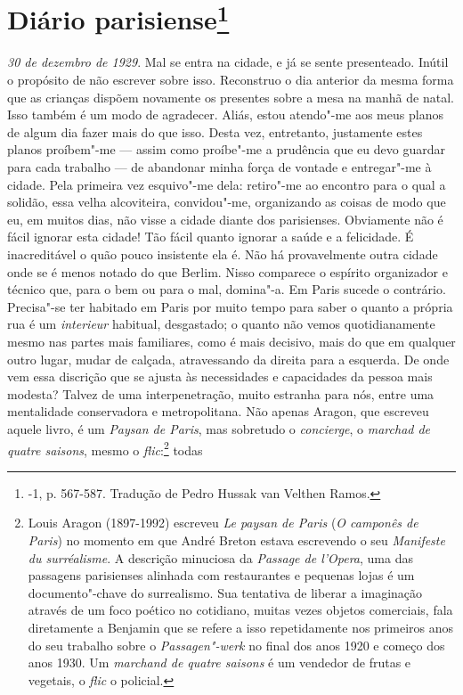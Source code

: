 \chapter{Diário parisiense\footnote[*]{-1, p.
  567-587. Tradução de Pedro Hussak van Velthen Ramos.}}

\emph{30 de dezembro de 1929}. Mal se entra na cidade, e já se sente
presenteado. Inútil o propósito de não escrever sobre isso.
Reconstruo o dia anterior da mesma forma que as crianças dispõem
novamente os presentes sobre a mesa na manhã de natal. Isso também é um
modo de agradecer. Aliás, estou atendo"-me aos meus planos de algum dia
fazer mais do que isso. Desta vez, entretanto, justamente estes planos
proíbem"-me --- assim como proíbe"-me a prudência que eu devo guardar para
cada trabalho --- de abandonar minha força de vontade e entregar"-me à
cidade. Pela primeira vez esquivo"-me dela: retiro"-me ao encontro para o
qual a solidão, essa velha alcoviteira, convidou"-me, organizando as
coisas de modo que eu, em muitos dias, não visse a cidade diante dos
parisienses. Obviamente não é fácil ignorar esta cidade! Tão fácil quanto
ignorar a saúde e a felicidade. É inacreditável o quão pouco insistente
ela é. Não há provavelmente outra cidade onde se é menos notado
do que Berlim. Nisso comparece o espírito organizador e
técnico que, para o bem ou para o mal, domina"-a. Em Paris sucede o
contrário. Precisa"-se ter habitado em Paris por muito tempo para saber o
quanto a própria rua é um \emph{interieur} habitual, desgastado;
o quanto não vemos quotidianamente mesmo nas partes mais
familiares, como é mais decisivo, mais do que em qualquer outro lugar, mudar de
calçada, atravessando da direita para a esquerda. De onde vem essa discrição
que se ajusta às necessidades e capacidades da pessoa mais modesta?
Talvez de uma interpenetração, muito estranha para nós, entre uma
mentalidade conservadora e metropolitana. Não apenas Aragon, que
escreveu aquele livro, é um \emph{Paysan de Paris}, mas sobretudo o
\emph{concierge}, o \emph{marchad de quatre saisons}, mesmo o
\emph{flic}:\footnote{Louis Aragon (1897-1992) escreveu
  \emph{Le paysan de Paris} (\emph{O camponês de Paris}) no momento em que André Breton estava
  escrevendo o seu \emph{Manifeste du surréalisme}. A descrição
  minuciosa da \emph{Passage de l'Opera}, uma das passagens parisienses
  alinhada com restaurantes e pequenas lojas é um documento"-chave do
  surrealismo. Sua tentativa de liberar a imaginação através de um foco
  poético no cotidiano, muitas vezes objetos comerciais, fala diretamente
  a Benjamin que se refere a isso repetidamente nos primeiros anos do
  seu trabalho sobre o \emph{Passagen"-werk} no final dos anos 1920 e
  começo dos anos 1930. Um \emph{marchand de quatre saisons} é um
  vendedor de frutas e vegetais, o \emph{flic} o policial. \versal{[N. E.]}} todas

